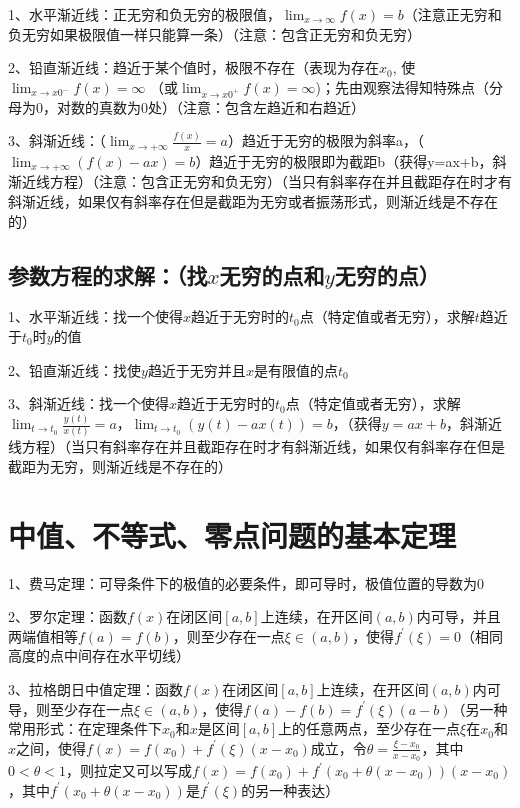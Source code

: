 1、水平渐近线：正无穷和负无穷的极限值，$\lim _{x \rightarrow \infty} f(x)=b$（注意正无穷和负无穷如果极限值一样只能算一条）（注意：包含正无穷和负无穷）

2、铅直渐近线：趋近于某个值时，极限不存在（表现为存在$x_{0}$,  使$\lim_{x \rightarrow x{0}^{-}} f(x)=\infty$ （或$\lim_{x \rightarrow x{0}^{+}} f(x)=\infty$)；先由观察法得知特殊点（分母为0，对数的真数为0处）（注意：包含左趋近和右趋近）

3、斜渐近线：（$\lim _{x \rightarrow+\infty} \frac{f(x)}{x}=a$）趋近于无穷的极限为斜率a，（$\lim _{x \rightarrow+\infty} ({f(x)}-{ax})=b$）趋近于无穷的极限即为截距b（获得y=ax+b，斜渐近线方程）（注意：包含正无穷和负无穷）（当只有斜率存在并且截距存在时才有斜渐近线，如果仅有斜率存在但是截距为无穷或者振荡形式，则渐近线是不存在的）



\subsection{参数方程的求解：（找$x$无穷的点和$y$无穷的点）}

1、水平渐近线：找一个使得$x$趋近于无穷时的$t_0$点（特定值或者无穷），求解$t$趋近于$t_0$时$y$的值

2、铅直渐近线：找使$y$趋近于无穷并且$x$是有限值的点$t_0$

3、斜渐近线：找一个使得$x$趋近于无穷时的$t_0$点（特定值或者无穷），求解$\lim _{t \rightarrow t_0} \frac{y(t)}{x(t)}=a$，$\lim _{t \rightarrow t_0} ({y(t)}-{ax(t)})=b$，（获得$y=ax+b$，斜渐近线方程）（当只有斜率存在并且截距存在时才有斜渐近线，如果仅有斜率存在但是截距为无穷，则渐近线是不存在的）

\section{中值、不等式、零点问题的基本定理}

1、费马定理：可导条件下的极值的必要条件，即可导时，极值位置的导数为0

2、罗尔定理：函数$f(x)$在闭区间$[a,b]$上连续，在开区间$(a,b)$内可导，并且两端值相等$f(a)=f(b)$，则至少存在一点$\xi \in(a, b)$，使得$f^{\prime}(\xi)=0$（相同高度的点中间存在水平切线）

3、拉格朗日中值定理：函数$f(x)$在闭区间$[a,b]$上连续，在开区间$(a,b)$内可导，则至少存在一点$\xi \in(a, b)$，使得$f(a)-f(b)=f^{\prime}(\xi)(a-b)$（另一种常用形式：在定理条件下$x_0$和$x$是区间$[a,b]$上的任意两点，至少存在一点$\xi$在$x_0$和$x$之间，使得$f(x)=f\left(x_{0}\right)+f^{\prime}(\xi)\left(x-x_{0}\right)$成立，令$\theta = \frac{\xi - x_0}{x-x_0}$，其中$0< \theta < 1$，则拉定又可以写成$f(x)=f\left(x_{0}\right)+f^{\prime}\left(x_{0}+\theta\left(x-x_{0}\right)\right)\left(x-x_{0}\right)$，其中$f^{\prime}\left(x_{0}+\theta\left(x-x_{0}\right)\right)$是$f^{\prime}(\xi)$的另一种表达）

